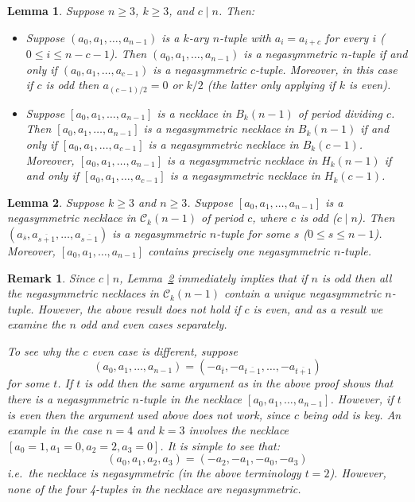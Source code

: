 \documentclass[10pt,a4paper]{amsart}
\newtheorem{lemma}{Lemma}
\newtheorem{remark}{Remark}
\begin{document}
\begin{lemma}  \label{lemma:nega_for_c}
Suppose $n\geq3$, $k\geq3$, and $c\mid n$.  Then:
\begin{itemize}
\item[(i)] Suppose $(a_0,a_1,\dots,a_{n-1})$ is a $k$-ary $n$-tuple with $a_{i}=a_{i+c}$ for
    every $i$ ($0\leq i\leq n-c-1$).  Then $(a_0,a_1,\dots,a_{n-1})$ is a negasymmetric
    $n$-tuple if and only if $(a_0,a_1,\dots,a_{c-1})$ is a negasymmetric $c$-tuple. Moreover,
    in this case if $c$ is odd then $a_{(c-1)/2}=0$ or $k/2$ (the latter only applying if $k$
    is even).
\item[(ii)] Suppose $[a_0,a_1,\dots,a_{n-1}]$ is a necklace in $B_k(n-1)$ of period dividing
    $c$. Then $[a_0,a_1,\dots,a_{n-1}]$ is a negasymmetric necklace in $B_k(n-1)$ if and only
    if $[a_0,a_1,\dots,a_{c-1}]$ is a negasymmetric necklace in $B_k(c-1)$. Moreover,
    $[a_0,a_1,\dots,a_{n-1}]$ is a negasymmetric necklace in $H_k(n-1)$ if and only if
    $[a_0,a_1,\dots,a_{c-1}]$ is a negasymmetric necklace in $H_k(c-1)$.
\end{itemize}
\end{lemma}

\begin{lemma}  \label{lemma:nega_ciruit_means_nega_tuple_odd_k_odd_c}
Suppose $k\geq3$ and $n\geq 3$.  Suppose $[a_0,a_1,\dots,a_{n-1}]$ is a negasymmetric necklace in
$\mathcal{C}_k(n-1)$ of period $c$, where $c$ is odd ($c\mid n$).  Then
$(a_{\overline{s}},a_{\overline{s+1}},\dots,a_{\overline{s-1}})$ is a negasymmetric $n$-tuple for
some $s$ ($0\leq s\leq n-1$).  Moreover, $[a_0,a_1,\dots,a_{n-1}]$ contains precisely one
negasymmetric $n$-tuple.
\end{lemma}

\begin{remark}  \label{remark:n_even_counterexample}  \label{remark:n_odd_OK}
Since $c\mid n$, Lemma~\ref{lemma:nega_ciruit_means_nega_tuple_odd_k_odd_c} immediately implies
that if $n$ is odd then all the negasymmetric necklaces in $\mathcal{C}_k(n-1)$ contain a unique
negasymmetric $n$-tuple. However, the above result does not hold if $c$ is even, and as a result we
examine the $n$ odd and even cases separately.

To see why the $c$ even case is different, suppose
\[ (a_0,a_1,\dots,a_{n-1}) = (-a_{\overline{t}},-a_{\overline{t-1}},\dots,-a_{\overline{t+1}}) \]
for some $t$.  If $t$ is odd then the same argument as in the above proof shows that there is a
negasymmetric $n$-tuple in the necklace $[a_0,a_1,\dots,a_{n-1}]$.  However, if $t$ is even then
the argument used above does not work, since $c$ being odd is key.  An example in the case $n=4$
and $k=3$ involves the necklace $[a_0=1,a_1=0,a_2=2,a_3=0]$.  It is simple to see that:
\[ (a_0,a_1,a_2,a_3)=(-a_2,-a_1,-a_0,-a_3) \]
i.e.\ the necklace is negasymmetric (in the above terminology $t=2$).  However, none of the four
4-tuples in the necklace are negasymmetric.
\end{remark}
\end{document}
